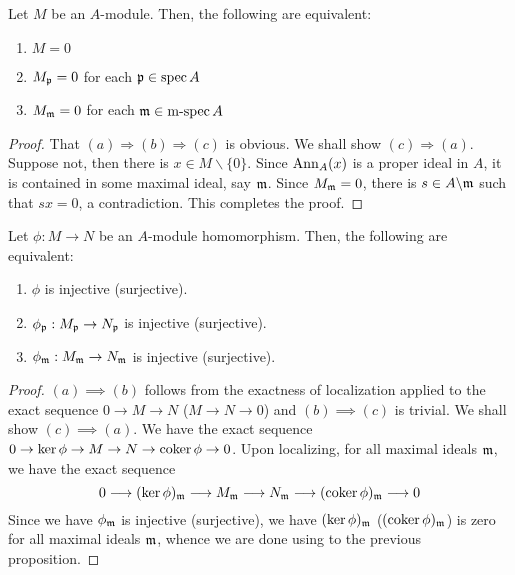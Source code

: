 \begin{proposition}
    Let $M$ be an $A$-module. Then, the following are equivalent: 
    \begin{enumerate}[label=(\alph*)]
        \item $M = 0$ 
        \item $M_\mathfrak p = 0$ for each $\mathfrak p\in\operatorname{spec} A$
        \item $M_\mathfrak m = 0$ for each $\mathfrak m\in\operatorname{m-spec} A$
    \end{enumerate}
\end{proposition}
\begin{proof}
    That $(a)\Longrightarrow(b)\Longrightarrow(c)$ is obvious. We shall show $(c)\Longrightarrow(a)$. Suppose not, then there is $x\in M\backslash\{0\}$. Since $\operatorname{Ann}_A(x)$ is a proper ideal in $A$, it is contained in some maximal ideal, say $\mathfrak m$. Since $M_\mathfrak m = 0$, there is $s\in A\backslash\mathfrak m$ such that $sx = 0$, a contradiction. This completes the proof.
\end{proof}

\begin{proposition}
    Let $\phi: M\to N$ be an $A$-module homomorphism. Then, the following are equivalent: 
    \begin{enumerate}[label=(\alph*)]
        \item $\phi$ is injective (surjective).
        \item $\phi_\mathfrak p: M_\mathfrak p\to N_\mathfrak p$ is injective (surjective).
        \item $\phi_\mathfrak m: M_\mathfrak m\to N_\mathfrak m$ is injective (surjective).
    \end{enumerate}
\end{proposition}
\begin{proof}
    $(a)\implies(b)$ follows from the exactness of localization applied to the exact sequence $0\rightarrow M\rightarrow N$ ($M\rightarrow N\rightarrow 0$) and $(b)\implies (c)$ is trivial. We shall show $(c)\implies(a)$. We have the exact sequence $0\rightarrow \ker \phi\rightarrow M\rightarrow N\rightarrow\operatorname{coker} \phi\rightarrow 0$. Upon localizing, for all maximal ideals $\mathfrak m$, we have the exact sequence 
    \begin{equation*}
        0\longrightarrow(\ker\phi)_\mathfrak m\longrightarrow M_\mathfrak m\longrightarrow N_\mathfrak m\longrightarrow(\operatorname{coker}\phi)_\mathfrak m\longrightarrow 0
    \end{equation*}
    Since we have $\phi_\mathfrak m$ is injective (surjective), we have $(\ker\phi)_\mathfrak m$ ($(\operatorname{coker}\phi)_\mathfrak m$) is zero for all maximal ideals $\mathfrak m$, whence we are done using  to the previous proposition.
\end{proof}


